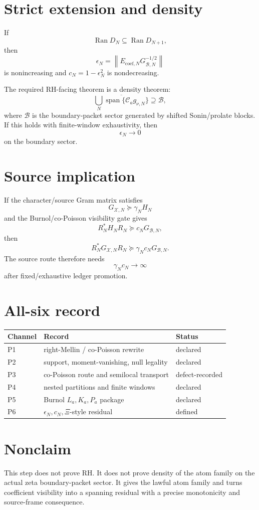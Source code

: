 \documentclass[11pt]{article}
\begin{document}
\section{Strict extension and density}

If
\[
\operatorname{Ran}D_N\subseteq \operatorname{Ran}D_{N+1},
\]
then
\[
\epsilon_N
=
\left\|E_{\mathrm{coef},N}G_{\mathcal B,N}^{-1/2}\right\|
\]
is nonincreasing and \(c_N=1-\epsilon_N^2\) is nondecreasing.

The required RH-facing theorem is a density theorem:
\[
\overline{\bigcup_N\operatorname{span}\{\mathcal C_a g_{\nu,N}\}}
\supseteq
\mathcal B,
\]
where \(\mathcal B\) is the boundary-packet sector generated by shifted Sonin/prolate blocks.
If this holds with finite-window exhaustivity, then
\[
\epsilon_N\to0
\]
on the boundary sector.

\section{Source implication}

If the character/source Gram matrix satisfies
\[
G_{\mathcal X,N}\succeq \gamma_N H_N
\]
and the Burnol/co-Poisson visibility gate gives
\[
R_N^*H_NR_N\succeq c_NG_{\mathcal B,N},
\]
then
\[
R_N^*G_{\mathcal X,N}R_N
\succeq
\gamma_Nc_NG_{\mathcal B,N}.
\]
The source route therefore needs
\[
\gamma_Nc_N\to\infty
\]
after fixed/exhaustive ledger promotion.

\section{All-six record}

\begin{center}
\begin{tabular}{lll}
\toprule
Channel & Record & Status\\
\midrule
P1 & right-Mellin / co-Poisson rewrite & declared\\
P2 & support, moment-vanishing, null legality & declared\\
P3 & co-Poisson route and semilocal transport & defect-recorded\\
P4 & nested partitions and finite windows & declared\\
P5 & Burnol \(L_a,K_a,P_a\) package & declared\\
P6 & \(\epsilon_N,c_N,\Xi\)-style residual & defined\\
\bottomrule
\end{tabular}
\end{center}

\section{Nonclaim}

This step does not prove RH. It does not prove density of the atom family on the actual zeta
boundary-packet sector. It gives the lawful atom family and turns coefficient visibility into a
spanning residual with a precise monotonicity and source-frame consequence.
\end{document}

